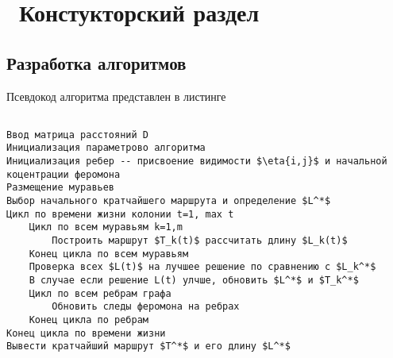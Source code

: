 \chapter{ Констукторский раздел}
\label{cha:design}
\section{ Разработка алгоритмов}

Псевдокод алгоритма представлен в листинге 

\begin{lstlisting}[caption={Псевдокод алгоритма муравья}, label={list:std}]

Ввод матрица расстояний D
Инициализация параметрово алгоритма
Инициализация ребер -- присвоение видимости $\eta{i,j}$ и начальной коцентрации феромона
Размещение муравьев
Выбор начального кратчайшего маршрута и определение $L^*$
Цикл по времени жизни колонии t=1, max t
    Цикл по всем муравьям k=1,m
        Построить маршрут $T_k(t)$ рассчитать длину $L_k(t)$
    Конец цикла по всем муравьям
    Проверка всех $L(t)$ на лучшее решение по сравнению с $L_k^*$
    В случае если решение L(t) улчше, обновить $L^*$ и $T_k^*$
    Цикл по всем ребрам графа
        Обновить следы феромона на ребрах
    Конец цикла по ребрам
Конец цикла по времени жизни
Вывести кратчайший маршрут $T^*$ и его длину $L^*$

\end{lstlisting}
